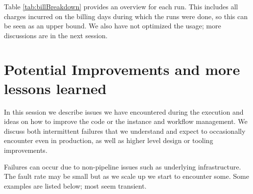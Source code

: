 Table \ref{tab:billBreakdown} provides an overview for each run.
This includes all charges incurred on the billing days during which the runs were done, so this can be seen as an upper bound.
We also have not optimized the usage; more discussions are in the next session.




\section{Potential Improvements and more lessons learned} \label{future}

In this session we describe issues we have encountered during the execution and ideas on how to improve the code or the instance and workflow management.
We discuss both intermittent failures that we understand and expect to occasionally encounter even in production, as well as higher level design or tooling improvements.

Failures can occur due to non-pipeline issues such as underlying infrastructure.
The fault rate may be small but as we scale up we start to encounter some.
Some examples are listed below; most seem transient.



